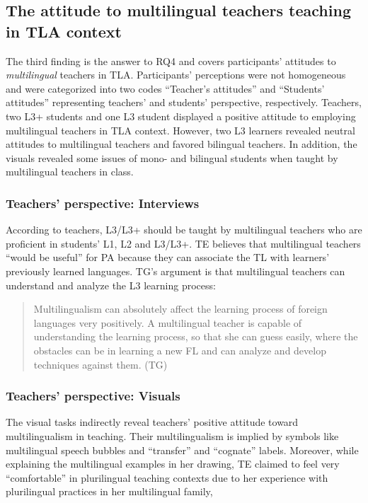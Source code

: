 \documentclass[output=paper]{../langscibook}
\begin{document}
\subsection{The attitude to multilingual teachers teaching in TLA context}
The third finding is the answer to RQ4 and covers participants’ attitudes to \emph{multilingual} teachers in TLA. Participants’ perceptions were not homogeneous and were categorized into two codes “Teacher’s attitudes” and “Students’ attitudes” representing teachers’ and students’ perspective, respectively.  Teachers, two L3+ students and one L3 student displayed a positive attitude to employing multilingual teachers in TLA context. However, two L3 learners revealed neutral attitudes to multilingual teachers and favored bilingual teachers. In addition, the visuals revealed some issues of mono- and bilingual students when taught by multilingual teachers in class.


\subsubsection{Teachers’ perspective: Interviews}
According to teachers, L3/L3+ should be taught by multilingual teachers who are proficient in students’ L1, L2 and L3/L3+. TE believes that multilingual teachers “would be useful” for PA because they can associate the TL with learners' previously learned languages.  TG’s argument is that multilingual teachers can understand and analyze the L3 learning process: 

\begin{quote}
Multilingualism can absolutely affect the learning process of foreign languages very positively. A multilingual teacher is capable of understanding the learning process, so that she can guess easily, where the obstacles can be in learning a new FL and can analyze and develop techniques against them. (TG) 
\end{quote}


\subsubsection{Teachers’ perspective: Visuals}
The visual tasks indirectly reveal teachers’ positive attitude toward multilingualism in teaching. Their multilingualism is implied by symbols like multilingual speech bubbles and “transfer” and “cognate” labels. Moreover, while explaining the multilingual examples in her drawing, TE claimed to feel very “comfortable” in plurilingual teaching contexts due to her experience with plurilingual practices in her multilingual family, 
\end{document}
